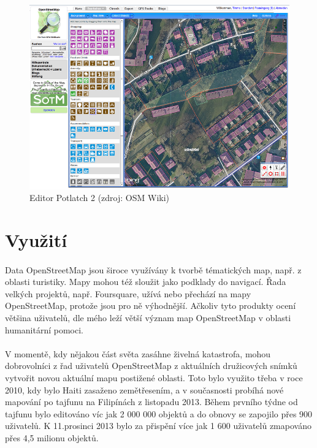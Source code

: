 \documentclass[11pt,a4paper,titlepage,oneside]{book}
\begin{document}
		\begin{figure}[!h]
			\begin{center}
				\includegraphics[width=12cm]{obrazky/p2_osm.png}
				\caption{Editor Potlatch 2 (zdroj: OSM Wiki\cite{wiki_p2})}
			\end{center}
		\end{figure}

	\section{Využití}
		\paragraph{} Data OpenStreetMap jsou široce využívány k tvorbě tématických map, např. z oblasti turistiky. Mapy mohou též sloužit jako podklady do navigací. Řada velkých projektů, např. Foursquare, užívá nebo přechází na mapy OpenStreetMap, protože jsou pro ně výhodnější. Ačkoliv tyto produkty ocení většina uživatelů, dle mého leží větší význam map OpenStreetMap v oblasti humanitární pomoci.
		\paragraph{}V momentě, kdy nějakou část světa zasáhne živelná katastrofa, mohou dobrovolníci z řad uživatelů OpenStreetMap z aktuálních družicových snímků vytvořit novou aktuální mapu postižené oblasti. Toto bylo využito třeba v roce 2010, kdy bylo Haiti zasaženo zemětřesením, a v současnosti probíhá nové mapování po tajfunu na Filipínách z listopadu 2013. Během prvního týdne od tajfunu bylo editováno víc jak 2 000 000 objektů a do obnovy se zapojilo přes 900 uživatelů. K 11.prosinci 2013 bylo za přispění více jak 1 600 uživatelů zmapováno přes 4,5 milionu objektů\cite{wiki_tajfun}.
\end{document}
